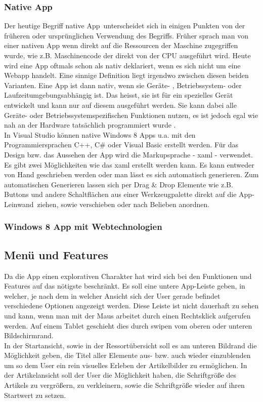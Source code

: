 \documentclass[12pt,a4paper,bibtotoc,abstracton]{scrartcl}
\begin{document}
\subsubsection{Native App}
\label{subsubsec:nativ}
Der heutige Begriff \glqq native App\grqq\ unterscheidet sich in einigen Punkten von der früheren oder ursprünglichen Verwendung des Begriffs. Früher sprach man von einer nativen App wenn direkt auf die Ressourcen der  Maschine zugegriffen wurde, wie z.B. Maschinencode der direkt von der CPU ausgeführt wird. Heute wird eine App oftmals schon als nativ deklariert, wenn es sich nicht um eine Webapp handelt. Eine sinnige Definition liegt irgendwo zwischen diesen beiden Varianten. Eine App ist dann nativ, wenn sie Geräte- , Betriebssystem- oder Laufzeitumgebungsabhängig ist. Das heisst, sie ist für ein spezielles Gerät entwickelt und kann nur auf diesem ausgeführt werden. Sie kann dabei alle Geräte- oder Betriebssystemspezifischen Funktionen nutzen, es ist jedoch egal wie nah an der Hardware tatsächlich programmiert wurde \citep{OBrian2013}.\\
In Visual Studio können native Windows 8  Apps u.a. mit den Programmiersprachen C++, C\# oder Visual Basic erstellt werden. Für das Design bzw. das Aussehen der App wird die Markupsprache - \ac{xaml} - verwendet. Es gibt zwei Möglichkeiten wie das \ac{xaml} erstellt werden kann. Es kann entweder von Hand geschrieben werden oder man lässt es sich automatisch generieren. Zum automatischen Generieren lassen sich per Drag \& Drop Elemente wie z.B. Buttons und andere Schaltflächen aus einer Werkzeugpalette direkt auf die \glqq App-Leinwand\grqq\ ziehen, sowie verschieben oder nach Belieben anordnen.

\subsubsection{Windows 8 App mit Webtechnologien}
\label{subsubsec:webwin8}

  


\subsection{Menü und Features}
\label{subsec:menuandproperties}
Da die App einen explorativen Charakter hat wird sich bei den Funktionen und Features auf das nötigste beschränkt. Es soll eine untere App-Leiste geben, in welcher, je nach dem in welcher Ansicht sich der User gerade befindet verschiedene Optionen angezeigt werden. Diese Leiste ist nicht dauerhaft zu sehen und kann, wenn man mit der Maus arbeitet durch einen Rechtsklick aufgerufen werden. Auf einem Tablet geschieht dies durch swipen vom oberen oder unteren Bildschirmrand.\\
In der Startansicht, sowie in der Ressortübersicht soll es am unteren Bildrand die Möglichkeit geben, die Titel aller Elemente aus- bzw. auch wieder einzublenden um so dem User ein rein visuelles Erleben der Artikelbilder zu ermöglichen. In der Artikelansicht soll der User die Möglichkeit haben, die Schriftgröße des Artikels zu vergrößern, zu verkleinern, sowie die Schriftgröße wieder auf ihren Startwert zu setzen. 
\end{document}
